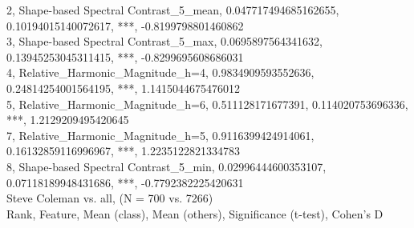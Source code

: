 2, Shape-based Spectral Contrast_5_mean, 0.047717494685162655, 0.10194015140072617, ***, -0.8199798801460862\\
3, Shape-based Spectral Contrast_5_max, 0.0695897564341632, 0.13945253045311415, ***, -0.8299695608686031\\
4, Relative_Harmonic_Magnitude_h=4, 0.9834909593552636, 0.24814254001564195, ***, 1.1415044675476012\\
5, Relative_Harmonic_Magnitude_h=6, 0.511128171677391, 0.114020753696336, ***, 1.2129209495420645\\
7, Relative_Harmonic_Magnitude_h=5, 0.9116399424914061, 0.16132859116996967, ***, 1.2235122821334783\\
8, Shape-based Spectral Contrast_5_min, 0.02996444600353107, 0.07118189948431686, ***, -0.7792382225420631\\
Steve Coleman vs. all, (N = 700 vs. 7266)\\
Rank, Feature, Mean (class), Mean (others), Significance (t-test), Cohen's D\\
